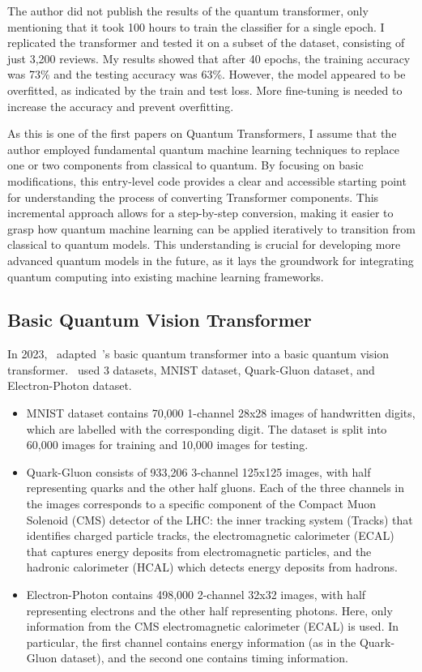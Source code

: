 The author did not publish the results of the quantum transformer,
only mentioning that it took 100 hours to train the classifier for a
single epoch. I replicated the transformer and tested it on a subset
of the dataset, consisting of just 3,200 reviews. My results showed
that after 40 epochs, the training accuracy was 73\% and the testing
accuracy was 63\%. However, the model appeared to be overfitted, as
indicated by the train and test loss. More fine-tuning is needed to
increase the accuracy and prevent overfitting.

As this is one of the first papers on Quantum Transformers, I assume
that the author employed fundamental quantum machine learning
techniques to replace one or two components from classical to
quantum. By focusing on basic modifications, this entry-level code
provides a clear and accessible starting point for understanding the
process of converting Transformer components. This incremental
approach allows for a step-by-step conversion, making it easier to
grasp how quantum machine learning can be applied iteratively to
transition from classical to quantum models. This understanding is
crucial for developing more advanced quantum models in the future, as
it lays the groundwork for integrating quantum computing into
existing machine learning frameworks.

\subsection{Basic Quantum Vision Transformer}
\label{subsec:basic_quantum_vision_transformer}
In 2023,~\citet{Cara2024QVT} adapted~\citet{disipio2021dawn}’s basic
quantum transformer into a basic quantum vision
transformer.~\citet{Cara2024QVT} used 3 datasets, MNIST dataset,
Quark-Gluon dataset, and Electron-Photon dataset.

\begin{itemize}
\item MNIST dataset contains 70,000 1-channel 28x28 images of
  handwritten digits, which are labelled with the corresponding
  digit. The dataset is split into 60,000 images for training and
  10,000 images for testing.

\item Quark-Gluon consists of 933,206 3-channel 125x125 images, with
  half representing quarks and the other half gluons. Each of the
  three channels in the images corresponds to a specific component of
  the Compact Muon Solenoid (CMS) detector of the LHC: the inner
  tracking system (Tracks) that identifies charged particle tracks,
  the electromagnetic calorimeter (ECAL) that captures energy
  deposits from electromagnetic particles, and the hadronic
  calorimeter (HCAL) which detects energy deposits from hadrons.

\item Electron-Photon contains 498,000 2-channel 32x32 images, with
  half representing electrons and the other half representing
  photons. Here, only information from the CMS electromagnetic
  calorimeter (ECAL) is used. In particular, the first channel
  contains energy information (as in the Quark-Gluon dataset), and
  the second one contains timing information.
\end{itemize}

